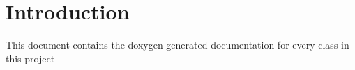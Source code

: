 \hypertarget{index_intro_sec}{}\section{Introduction}\label{index_intro_sec}
This document contains the doxygen generated documentation for every class in this project 